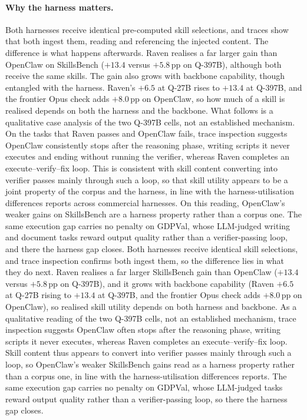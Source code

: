 \paragraph{Why the harness matters.}
\ifarxiv
Both harnesses receive identical pre-computed skill selections,
and traces show that both ingest them, reading and referencing
the injected content.  The difference is what happens afterwards.
Raven realises a far larger gain than OpenClaw on SkillsBench
($+13.4$ versus $+5.8$\,pp on Q-397B), although both receive the
same skills.  The gain also grows with backbone capability, though entangled
with the harness.  Raven's $+6.5$ at Q-27B rises to $+13.4$ at
Q-397B, and the frontier Opus check adds $+8.0$\,pp on OpenClaw, so
how much of a skill is realised depends on both the harness and the
backbone.
What follows is a qualitative case analysis of the
two Q-397B cells, not an established mechanism.  On the tasks that
Raven passes and OpenClaw fails, trace inspection suggests OpenClaw
consistently stops after the reasoning phase, writing scripts it
never executes and ending without running the verifier, whereas
Raven completes an execute--verify--fix loop.  This is consistent
with skill content converting into verifier passes mainly through
such a loop, so that skill utility appears to be a joint property
of the corpus and the harness, in line with the harness-utilisation
differences \citet{SkillsBench2026} reports across commercial
harnesses.  On this reading, OpenClaw's weaker gains on SkillsBench
are a harness property rather than a corpus one.  The same
execution gap carries no penalty on GDPVal, whose LLM-judged
writing and document tasks reward output quality rather than a
verifier-passing loop, and there the harness gap closes.
\else
Both harnesses receive identical skill selections, and trace
inspection confirms both ingest them, so the difference lies in what
they do next.  Raven realises a far larger SkillsBench gain than
OpenClaw ($+13.4$ versus $+5.8$\,pp on Q-397B), and it grows with
backbone capability (Raven $+6.5$ at Q-27B rising to $+13.4$ at
Q-397B, and the frontier Opus check adds $+8.0$\,pp on OpenClaw), so
realised skill utility depends on both harness and backbone.  As a
qualitative reading of the two Q-397B cells, not an established
mechanism, trace inspection suggests OpenClaw often stops after the
reasoning phase, writing scripts it never executes, whereas Raven
completes an execute--verify--fix loop.  Skill content thus appears
to convert into verifier passes mainly through such a loop, so
OpenClaw's weaker SkillsBench gains read as a harness property rather
than a corpus one, in line with the harness-utilisation differences
\citet{SkillsBench2026} reports.  The same execution gap carries no
penalty on GDPVal, whose LLM-judged tasks reward output quality
rather than a verifier-passing loop, so there the harness gap closes.
\fi

